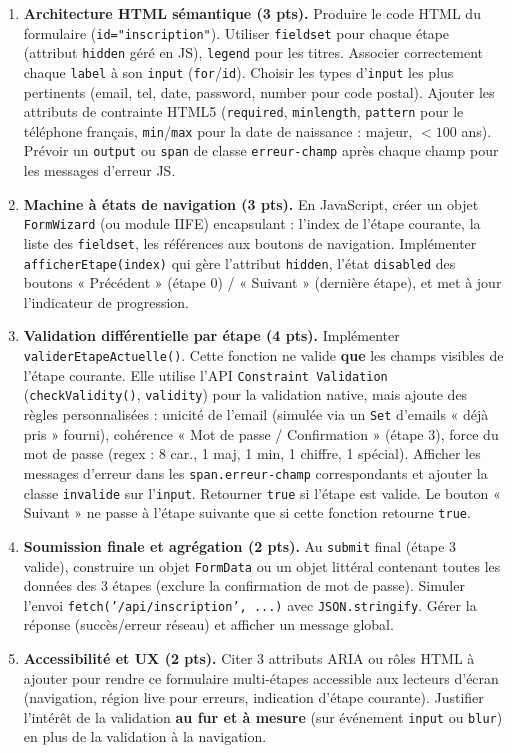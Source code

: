 \documentclass[11pt]{article}
\begin{document}
\begin{exercice}
\begin{enumerate}
    \item \textbf{Architecture HTML sémantique (3 pts).} Produire le code HTML du formulaire (\texttt{id="inscription"}). Utiliser \texttt{fieldset} pour chaque étape (attribut \texttt{hidden} géré en JS), \texttt{legend} pour les titres. Associer correctement chaque \texttt{label} à son \texttt{input} (\texttt{for}/\texttt{id}). Choisir les types d'\texttt{input} les plus pertinents (email, tel, date, password, number pour code postal). Ajouter les attributs de contrainte HTML5 (\texttt{required}, \texttt{minlength}, \texttt{pattern} pour le téléphone français, \texttt{min}/\texttt{max} pour la date de naissance : majeur, $<100$ ans). Prévoir un \texttt{output} ou \texttt{span} de classe \texttt{erreur-champ} après chaque champ pour les messages d'erreur JS.
    \item \textbf{Machine à états de navigation (3 pts).} En JavaScript, créer un objet \texttt{FormWizard} (ou module IIFE) encapsulant : l'index de l'étape courante, la liste des \texttt{fieldset}, les références aux boutons de navigation. Implémenter \texttt{afficherEtape(index)} qui gère l'attribut \texttt{hidden}, l'état \texttt{disabled} des boutons « Précédent » (étape 0) / « Suivant » (dernière étape), et met à jour l'indicateur de progression.
    \item \textbf{Validation différentielle par étape (4 pts).} Implémenter \texttt{validerEtapeActuelle()}. Cette fonction ne valide \textbf{que} les champs visibles de l'étape courante. Elle utilise l'API \texttt{Constraint Validation} (\texttt{checkValidity()}, \texttt{validity}) pour la validation native, mais ajoute des règles personnalisées : unicité de l'email (simulée via un \texttt{Set} d'emails « déjà pris » fourni), cohérence « Mot de passe / Confirmation » (étape 3), force du mot de passe (regex : 8 car., 1 maj, 1 min, 1 chiffre, 1 spécial). Afficher les messages d'erreur dans les \texttt{span.erreur-champ} correspondants et ajouter la classe \texttt{invalide} sur l'\texttt{input}. Retourner \texttt{true} si l'étape est valide. Le bouton « Suivant » ne passe à l'étape suivante que si cette fonction retourne \texttt{true}.
    \item \textbf{Soumission finale et agrégation (2 pts).} Au \texttt{submit} final (étape 3 valide), construire un objet \texttt{FormData} ou un objet littéral contenant toutes les données des 3 étapes (exclure la confirmation de mot de passe). Simuler l'envoi \texttt{fetch('/api/inscription', ...)} avec \texttt{JSON.stringify}. Gérer la réponse (succès/erreur réseau) et afficher un message global.
    \item \textbf{Accessibilité et UX (2 pts).} Citer 3 attributs ARIA ou rôles HTML à ajouter pour rendre ce formulaire multi-étapes accessible aux lecteurs d'écran (navigation, région live pour erreurs, indication d'étape courante). Justifier l'intérêt de la validation \textbf{au fur et à mesure} (sur événement \texttt{input} ou \texttt{blur}) en plus de la validation à la navigation.
\end{enumerate}
\end{exercice}
\end{document}
